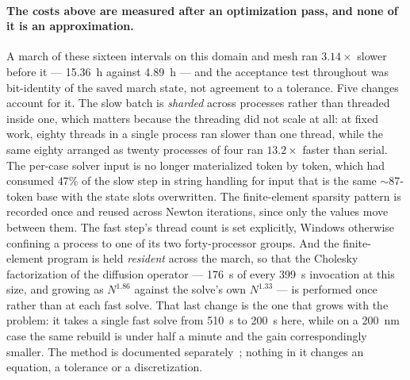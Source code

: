 \paragraph{The costs above are measured after an optimization pass, and none of
it is an approximation.} A march of these sixteen intervals on this domain and
mesh ran $3.14\times$ slower before it --- \SI{15.36}{\hour} against
\SI{4.89}{\hour} --- and the acceptance test throughout was bit-identity of the
saved march state, not agreement to a tolerance. Five changes account for it.
The slow batch is \emph{sharded} across processes rather than threaded inside
one, which matters because the threading did not scale at all: at fixed work,
eighty threads in a single process ran slower than one thread, while the same
eighty arranged as twenty processes of four ran $13.2\times$ faster than serial.
The per-case solver input is no longer materialized token by token, which had
consumed $47\%$ of the slow step in string handling for input that is the same
$\sim$87-token base with the state slots overwritten. The finite-element
sparsity pattern is recorded once and reused across Newton iterations, since
only the values move between them. The fast step's thread count is set
explicitly, Windows otherwise confining a process to one of its two
forty-processor groups. And the finite-element program is held \emph{resident}
across the march, so that the Cholesky factorization of the diffusion operator
--- \SI{176}{\second} of every \SI{399}{\second} invocation at this size, and
growing as $N^{1.86}$ against the solve's own $N^{1.33}$ --- is performed once
rather than at each fast solve. That last change is the one that grows with the
problem: it takes a single fast solve from \SI{510}{\second} to
\SI{200}{\second} here, while on a \SI{200}{\nano\meter} case the same rebuild
is under half a minute and the gain correspondingly smaller. The method is
documented separately~\citep{dislocluster_opt}; nothing in it changes an
equation, a tolerance or a discretization.
